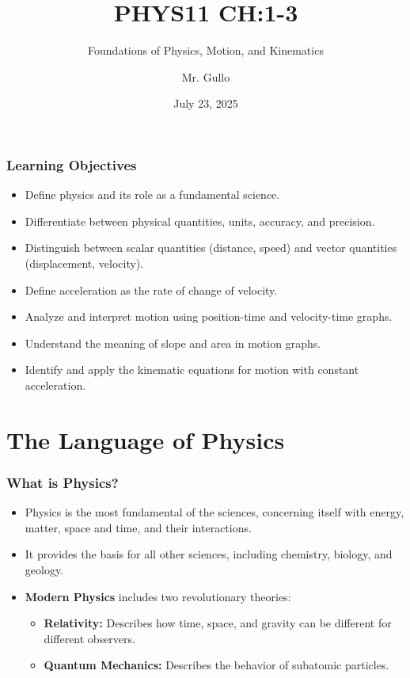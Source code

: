 \documentclass{beamer}
\title[Intro to Physics and Kinematics]{PHYS11 CH:1-3}
\subtitle{Foundations of Physics, Motion, and Kinematics}
\author[Mr. Gullo]{Mr. Gullo}
\date[Jul 2025]{July 23, 2025}
\begin{document}
\frame{\titlepage}

\begin{frame}
\frametitle{Learning Objectives}
\begin{itemize}
    \item Define physics and its role as a fundamental science.
    \item Differentiate between physical quantities, units, accuracy, and precision.
    \item Distinguish between scalar quantities (distance, speed) and vector quantities (displacement, velocity).
    \item Define acceleration as the rate of change of velocity.
    \item Analyze and interpret motion using position-time and velocity-time graphs.
    \item Understand the meaning of slope and area in motion graphs.
    \item Identify and apply the kinematic equations for motion with constant acceleration.
\end{itemize}
\end{frame}

\section{The Language of Physics}

\begin{frame}
\frametitle{What is Physics?}
\begin{itemize}
    \item Physics is the most fundamental of the sciences, concerning itself with \alert{energy, matter, space and time}, and their interactions.
    \item It provides the basis for all other sciences, including chemistry, biology, and geology.
    \item \textbf{Modern Physics} includes two revolutionary theories:
    \begin{itemize}
        \item \textbf{Relativity:} Describes how time, space, and gravity can be different for different observers.
        \item \textbf{Quantum Mechanics:} Describes the behavior of subatomic particles.
    \end{itemize}
\end{itemize}
\end{frame}
\end{document}
